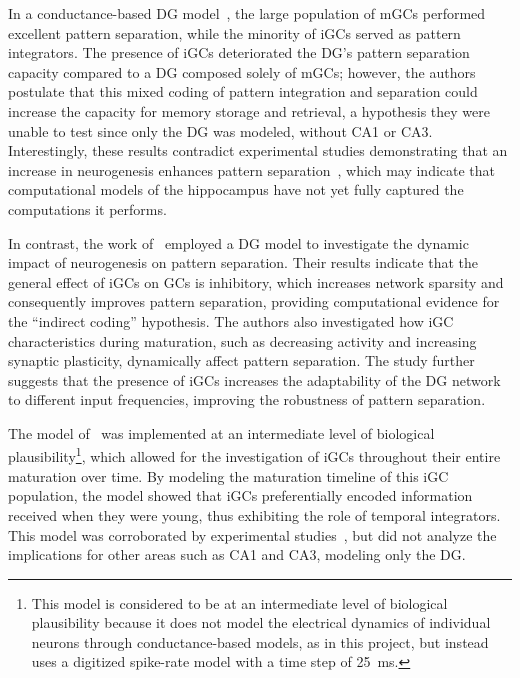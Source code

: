 In a conductance-based DG model~\parencite{kimEffect2024}, the large population of mGCs performed excellent pattern separation, while
the minority of iGCs served as pattern integrators. The presence of iGCs deteriorated the DG's pattern separation capacity
compared to a DG composed solely of mGCs; however, the authors postulate that this mixed coding of pattern integration and
separation could increase the capacity for memory storage and retrieval, a hypothesis they were unable to test since only the DG
was modeled, without CA1 or CA3. Interestingly, these results contradict experimental studies demonstrating that an increase in
neurogenesis enhances pattern separation~\parencite{sahayIncreasing2011}, which may indicate that computational models of the
hippocampus have not yet fully captured the computations it performs.

In contrast, the work of~\textcite{yangDynamic2025} employed a DG model to investigate the dynamic impact of neurogenesis on
pattern separation. Their results indicate that the general effect of iGCs on GCs is inhibitory, which increases network
sparsity and consequently improves pattern separation, providing computational evidence for the ``indirect coding'' hypothesis.
The authors also investigated how iGC characteristics during maturation, such as decreasing activity and increasing synaptic
plasticity, dynamically affect pattern separation. The study further suggests that the presence of iGCs increases the
adaptability of the DG network to different input frequencies, improving the robustness of pattern separation.

The model of~\textcite{aimoneComputational2009} was implemented at an intermediate level of biological
plausibility\footnote{This model is considered to be at an intermediate level of biological plausibility because it does not
model the electrical dynamics of individual neurons through conductance-based models, as in this project, but instead uses a
digitized spike-rate model with a time step of \SI{25}{\milli\second}.}, which allowed for the investigation of iGCs throughout
their entire maturation over time. By modeling the maturation timeline of this iGC population, the model showed that iGCs
preferentially encoded information received when they were young, thus exhibiting the role of temporal integrators. This model
was corroborated by experimental studies~\parencite{berdugo-vegaSharpening2023}, but did not analyze the implications for other
areas such as CA1 and CA3, modeling only the DG\@.

